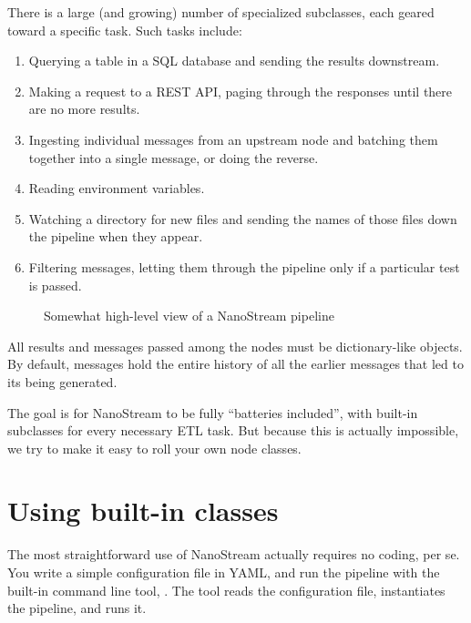 \documentclass[letterpaper,10pt,english]{sphinxmanual}
\let\sphinxpxdimen\pdfpxdimen\else\newdimen\sphinxpxdimen
\begin{document}
There is a large (and growing) number of specialized  subclasses,
each geared toward a specific task. Such tasks include:
\begin{enumerate}
\def\theenumi{\arabic{enumi}}
\def\labelenumi{\theenumi .}
\makeatletter\def\p@enumii{\p@enumi \theenumi .}\makeatother
\item {} 
Querying a table in a SQL database and sending the results downstream.

\item {} 
Making a request to a REST API, paging through the responses until there are
no more results.

\item {} 
Ingesting individual messages from an upstream node and batching them
together into a single message, or doing the reverse.

\item {} 
Reading environment variables.

\item {} 
Watching a directory for new files and sending the names of those files
down the pipeline when they appear.

\item {} 
Filtering messages, letting them through the pipeline only if a particular
test is passed.

\end{enumerate}

\begin{figure}[htbp]
\centering
\capstart

\noindent\sphinxincludegraphics[width=600\sphinxpxdimen]{{10k_view}.png}
\caption{Somewhat high-level view of a NanoStream pipeline}\label{\detokenize{overview:id2}}\end{figure}

All results and messages passed among the nodes must be dictionary-like
objects. By default, messages hold the entire history of all the earlier
messages that led to its being generated.

The goal is for NanoStream to be fully “batteries included”, with built-in
 subclasses for every necessary ETL task. But because this is
actually impossible, we try to make it easy to roll your own node classes.


\section{Using built-in  classes}
\label{\detokenize{overview:using-built-in-nanonode-classes}}
The most straightforward use of NanoStream actually requires no coding, per se.
You write a simple configuration file in YAML, and run the pipeline with the
built-in command line tool, . The tool reads the
configuration file, instantiates the pipeline, and runs it.
\end{document}
